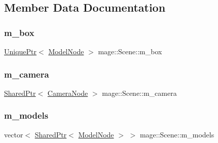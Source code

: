 \subsection{Member Data Documentation}
\hypertarget{classmage_1_1_scene_a9262224724837e9840677615a6eb5507}{}\label{classmage_1_1_scene_a9262224724837e9840677615a6eb5507} 
\subsubsection{\texorpdfstring{m\+\_\+box}{m\_box}}
{\footnotesize\ttfamily \hyperlink{namespacemage_a3316d7143a973e37adf1110f2e80ca31}{Unique\+Ptr}$<$ \hyperlink{classmage_1_1_model_node}{Model\+Node} $>$ mage\+::\+Scene\+::m\+\_\+box\hspace{0.3cm}{\ttfamily [private]}}

\hypertarget{classmage_1_1_scene_a39c785951d9fb99477c1894eabba0cc6}{}\label{classmage_1_1_scene_a39c785951d9fb99477c1894eabba0cc6} 
\subsubsection{\texorpdfstring{m\+\_\+camera}{m\_camera}}
{\footnotesize\ttfamily \hyperlink{namespacemage_a1e01ae66713838a7a67d30e44c67703e}{Shared\+Ptr}$<$ \hyperlink{classmage_1_1_camera_node}{Camera\+Node} $>$ mage\+::\+Scene\+::m\+\_\+camera\hspace{0.3cm}{\ttfamily [private]}}

\hypertarget{classmage_1_1_scene_a01132a667fbc1517f11ae561bc221071}{}\label{classmage_1_1_scene_a01132a667fbc1517f11ae561bc221071} 
\subsubsection{\texorpdfstring{m\+\_\+models}{m\_models}}
{\footnotesize\ttfamily vector$<$ \hyperlink{namespacemage_a1e01ae66713838a7a67d30e44c67703e}{Shared\+Ptr}$<$ \hyperlink{classmage_1_1_model_node}{Model\+Node} $>$ $>$ mage\+::\+Scene\+::m\+\_\+models\hspace{0.3cm}{\ttfamily [private]}}

\hypertarget{classmage_1_1_scene_a6cc8cb08b1853c4e3063b33a94e8fb47}{}\label{classmage_1_1_scene_a6cc8cb08b1853c4e3063b33a94e8fb47} 
